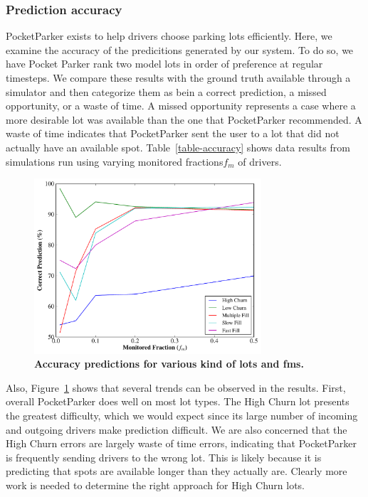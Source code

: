 \subsubsection{Prediction accuracy}




PocketParker exists to help drivers choose parking lots efficiently.  Here,
we examine the accuracy of the predicitions generated by our system.  To do
so, we have Pocket Parker rank two model lots in order of preference at
regular timesteps.  We compare these results with the ground truth available
through a simulator and then categorize them as bein a correct prediction,
a missed opportunity, or a waste of time. A missed opportunity represents a
case where a more desirable lot was available than the one that PocketParker
recommended. A waste of time indicates that PocketParker sent the user to a
lot that did not actually have an available spot.  Table~\ref{table-accuracy}
shows data results from simulations run using varying monitored
fractions$f_m$ of drivers.

\begin{figure}[t]
\centering
\includegraphics[width=3.325in]{./simulator/figures/accuracy_graph.pdf}

\caption{\textbf{Accuracy predictions for various kind of lots and fms.} }
\label{fig-accuracy}
\end{figure}

Also, Figure~\ref{fig-accuracy} shows that several trends can be observed 
in the results. First, overall PocketParker does well on most lot types. 
The High Churn lot presents the greatest difficulty, which we would expect 
since its large number of incoming and outgoing drivers make prediction 
difficult. We are also concerned that the High Churn errors are largely 
waste of time errors, indicating that PocketParker is frequently sending 
drivers to the wrong lot.  This is likely because it is predicting that 
spots are available longer than they actually are. Clearly more work is 
needed to determine the right approach for High Churn lots.

